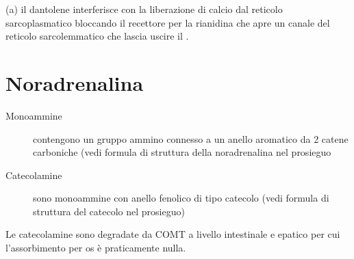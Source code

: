 (a) il dantolene interferisce con la liberazione di calcio dal reticolo sarcoplasmatico bloccando il recettore per la rianidina che apre un canale del reticolo sarcolemmatico che lascia uscire il .

\section{Noradrenalina}

\begin{description}
\item[Monoammine] contengono un gruppo ammino connesso a un anello aromatico da 2 catene carboniche (vedi formula di struttura della noradrenalina nel prosieguo
\item[Catecolamine] sono monoammine con anello fenolico di tipo catecolo (vedi formula di struttura del catecolo nel prosieguo)
\end{description}




Le catecolamine sono degradate da COMT a livello intestinale e epatico per cui l'assorbimento per os \`e praticamente nulla.

